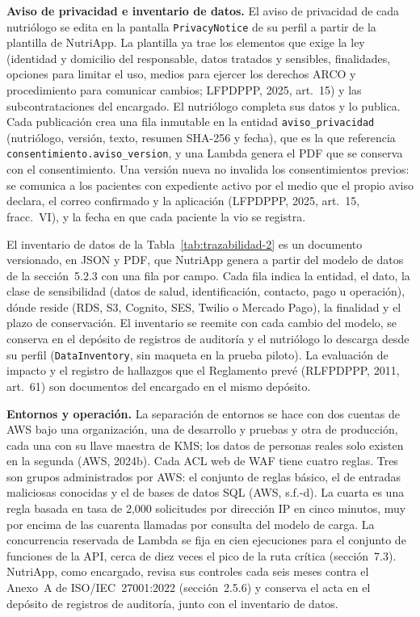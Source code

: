 \documentclass[12pt, a4paper]{article}
\begin{document}
\textbf{Aviso de privacidad e inventario de datos.} El aviso de
privacidad de cada nutriólogo se edita en la pantalla
\texttt{PrivacyNotice} de su perfil a partir de la plantilla de
NutriApp. La plantilla ya trae los elementos que exige la ley (identidad
y domicilio del responsable, datos tratados y sensibles, finalidades,
opciones para limitar el uso, medios para ejercer los derechos ARCO y
procedimiento para comunicar cambios; LFPDPPP, 2025, art.~15) y las
subcontrataciones del encargado. El nutriólogo completa sus datos y lo
publica. Cada publicación crea una fila inmutable en la entidad
\texttt{aviso\_privacidad} (nutriólogo, versión, texto, resumen SHA-256
y fecha), que es la que referencia
\texttt{consentimiento.aviso\_version}, y una Lambda genera el PDF que
se conserva con el consentimiento. Una versión nueva no invalida los
consentimientos previos: se comunica a los pacientes con expediente
activo por el medio que el propio aviso declara, el correo confirmado y
la aplicación (LFPDPPP, 2025, art.~15, fracc.~VI), y la fecha en que
cada paciente la vio se registra.

El inventario de datos de la Tabla~\ref{tab:trazabilidad-2} es un
documento versionado, en JSON y PDF, que NutriApp genera a partir del
modelo de datos de la sección~5.2.3 con una fila por campo. Cada fila
indica la entidad, el dato, la clase de sensibilidad (datos de salud,
identificación, contacto, pago u operación), dónde reside (RDS, S3,
Cognito, SES, Twilio o Mercado Pago), la finalidad y el plazo de
conservación. El inventario se reemite con cada cambio del modelo, se
conserva en el depósito de registros de auditoría y el nutriólogo lo
descarga desde su perfil (\texttt{DataInventory}, sin maqueta en la
prueba piloto). La evaluación de impacto y el registro de hallazgos que
el Reglamento prevé (RLFPDPPP, 2011, art.~61) son documentos del
encargado en el mismo depósito.
 
\textbf{Entornos y operación.} La separación de entornos se hace con dos
cuentas de AWS bajo una organización, una de desarrollo y pruebas y otra
de producción, cada una con su llave maestra de KMS; los datos de
personas reales solo existen en la segunda (AWS, 2024b). Cada ACL web de
WAF tiene cuatro reglas. Tres son grupos administrados por AWS: el
conjunto de reglas básico, el de entradas maliciosas conocidas y el de
bases de datos SQL (AWS, s.f.-d). La cuarta es una regla basada en tasa
de 2,000 solicitudes por dirección IP en cinco minutos, muy por encima
de las cuarenta llamadas por consulta del modelo de carga. La
concurrencia reservada de Lambda se fija en cien ejecuciones para el
conjunto de funciones de la API, cerca de diez veces el pico de la ruta
crítica (sección~7.3). NutriApp, como encargado, revisa sus controles
cada seis meses contra el Anexo~A de ISO/IEC~27001:2022 (sección~2.5.6)
y conserva el acta en el depósito de registros de auditoría, junto con
el inventario de datos.
 
\end{document}
